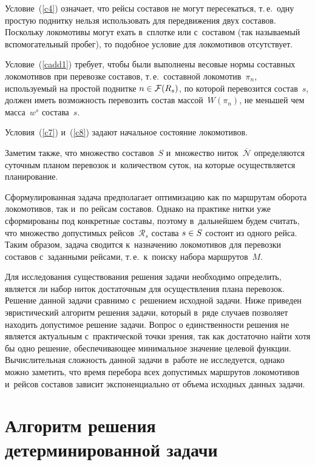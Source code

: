 \begin{multicols}{2}
Условие~(\ref{c4}) означает, что рейсы составов не могут пересекаться, т.\,е.\
 одну простую поднитку нельзя использовать для передвижения двух составов. 
 Поскольку локомотивы могут ехать в~сплотке или с~составом (так называемый 
 вспомогательный пробег), то подобное условие для локомотивов отсутствует.

Условие~(\ref{cadd1}) требует, чтобы были выполнены весовые нормы составных 
локомотивов при перевозке составов, т.\,е.\ составной локомотив~$\pi_n$, 
используемый на простой поднитке $n \hm\in \mathcal F(R_s)$, по которой 
перевозится состав~$s$, должен иметь возможность перевозить состав массой~$W(\pi_n)$, 
не меньшей чем масса~$w^s$ состава~$s$.

Условия~(\ref{c7}) и~(\ref{c8}) задают начальное состояние локомотивов.

Заметим также, что множество составов~$S$ и~множество ниток~$\overline{\mathcal N}$ 
определяются суточным планом перевозок и~количеством суток, на которые осуществляется 
планирование.

Сформулированная задача предполагает оптимизацию как по маршрутам оборота локомотивов, 
так и~по рейсам составов. Однако на практике нитки уже сформированы под конкретные 
составы, поэтому в~дальнейшем будем считать, что множество допустимых 
рейсов~$\mathcal R_s$ состава $s\hm\in S$ состоит из одного рейса. 
Таким образом, задача сводится к~назначению локомотивов для перевозки 
составов с~заданными рейсами, т.\,е.\ к~поиску набора маршрутов~$M$.


Для исследования существования решения задачи необходимо определить, 
является ли набор ниток достаточным
для осуществления плана перевозок.
Решение данной задачи сравнимо с~решением исходной задачи. Ниже приведен 
эвристический алгоритм решения задачи,
который в~ряде случаев позволяет находить допустимое решение задачи.
Вопрос о единственности решения не является актуальным с~практической точки зрения,
так как достаточно найти хотя бы одно решение, обеспечивающее минимальное значение 
целевой функции.
Вычислительная сложность данной задачи в~работе не исследуется, однако можно заметить,
что время перебора всех допустимых маршрутов локомотивов и~рейсов составов
зависит экспоненциально от объема исходных данных задачи.

\vspace*{-2pt}

\section{Алгоритм решения детерминированной задачи}


\end{multicols}
